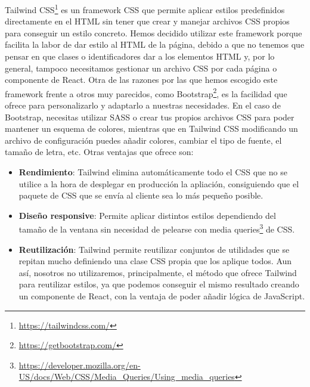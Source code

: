 Tailwind CSS\footnote{\url{https://tailwindcss.com/}} es un framework CSS que permite aplicar estilos predefinidos directamente en el HTML sin tener que crear y manejar archivos CSS propios para conseguir un estilo concreto. Hemos decidido utilizar este framework porque facilita la labor de dar estilo al HTML de la página, debido a que no tenemos que pensar en que clases o identificadores dar a los elementos HTML y, por lo general, tampoco necesitamos gestionar un archivo CSS por cada página o componente de React. Otra de las razones por las que hemos escogido este framework frente a otros muy parecidos, como Bootstrap\footnote{\url{https://getbootstrap.com/}}, es la facilidad que ofrece para personalizarlo y adaptarlo a nuestras necesidades. En el caso de Bootstrap, necesitas utilizar SASS o crear tus propios archivos CSS para poder mantener un esquema de colores, mientras que en Tailwind CSS modificando un archivo de configuración puedes añadir colores, cambiar el tipo de fuente, el tamaño de letra, etc. Otras ventajas que ofrece son:
\begin{itemize}
    \item \textbf{Rendimiento}: Tailwind elimina automáticamente todo el CSS que no se utilice a la hora de desplegar en producción la apliación, consiguiendo que el paquete de CSS que se envía al cliente sea lo más pequeño posible.
    \item \textbf{Diseño responsive}: Permite aplicar distintos estilos dependiendo del tamaño de la ventana sin necesidad de pelearse con media queries\footnote{\url{https://developer.mozilla.org/en-US/docs/Web/CSS/Media_Queries/Using_media_queries}} de CSS.
    \item \textbf{Reutilización}: Tailwind permite reutilizar conjuntos de utilidades que se repitan mucho definiendo una clase CSS propia que los aplique todos. Aun así, nosotros no utilizaremos, principalmente, el método que ofrece Tailwind para reutilizar estilos, ya que podemos conseguir el mismo resultado creando un componente de React, con la ventaja de poder añadir lógica de JavaScript.
\end{itemize}


